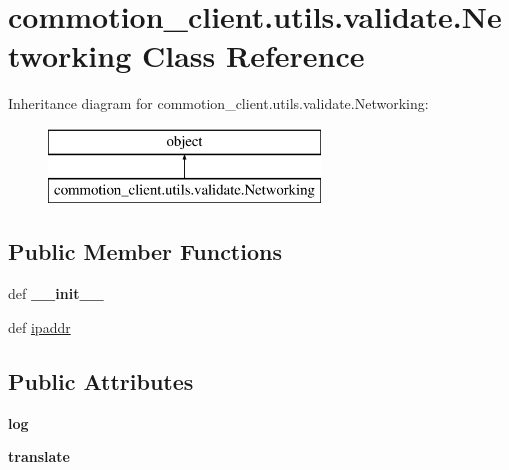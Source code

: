 \hypertarget{classcommotion__client_1_1utils_1_1validate_1_1Networking}{\section{commotion\+\_\+client.\+utils.\+validate.\+Networking Class Reference}
\label{classcommotion__client_1_1utils_1_1validate_1_1Networking}
}
Inheritance diagram for commotion\+\_\+client.\+utils.\+validate.\+Networking\+:\begin{figure}[H]
\begin{center}
\leavevmode
\includegraphics[height=2.000000cm]{classcommotion__client_1_1utils_1_1validate_1_1Networking}
\end{center}
\end{figure}
\subsection*{Public Member Functions}
\begin{DoxyCompactItemize}
\item 
\hypertarget{classcommotion__client_1_1utils_1_1validate_1_1Networking_af83f8af7dc9fd426c27d7fd214051edc}{def {\bfseries \+\_\+\+\_\+init\+\_\+\+\_\+}}\label{classcommotion__client_1_1utils_1_1validate_1_1Networking_af83f8af7dc9fd426c27d7fd214051edc}

\item 
def \hyperlink{classcommotion__client_1_1utils_1_1validate_1_1Networking_aaeee5dedbe589a997ddf820b17359c35}{ipaddr}
\end{DoxyCompactItemize}
\subsection*{Public Attributes}
\begin{DoxyCompactItemize}
\item 
\hypertarget{classcommotion__client_1_1utils_1_1validate_1_1Networking_af284adbbe8265ea379d64d3d6ee66342}{{\bfseries log}}\label{classcommotion__client_1_1utils_1_1validate_1_1Networking_af284adbbe8265ea379d64d3d6ee66342}

\item 
\hypertarget{classcommotion__client_1_1utils_1_1validate_1_1Networking_a2728d53728c499c4da34412a8b773216}{{\bfseries translate}}\label{classcommotion__client_1_1utils_1_1validate_1_1Networking_a2728d53728c499c4da34412a8b773216}

\end{DoxyCompactItemize}


